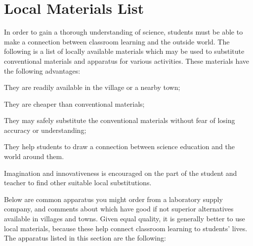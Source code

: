 
\chapter{Local Materials List}
\label{cha:local-materials}
In order to gain a thorough understanding of science, students must be able to make a connection between classroom learning and the outside world. The following is a list of locally available materials which may be used to substitute conventional materials and apparatus for various activities. These materials have the following advantages: 
\begin{itemize*}
\item They are readily available in the village or a nearby town;
\item They are cheaper than conventional materials; 
\item They may safely substitute the conventional materials without fear of losing accuracy or understanding; 
\item They help students to draw a connection between science education and the world around them.
\end{itemize*}
Imagination and innovativeness is encouraged on the part of the student and teacher to find other suitable local substitutions. 

Below are common apparatus you might order from a laboratory supply company, 
and comments about which have good if not superior alternatives 
available in villages and towns. 
Given equal quality, 
it is generally better to use local materials, 
because these help connect classroom learning to students' lives.\\

The apparatus listed in this section are the following:

